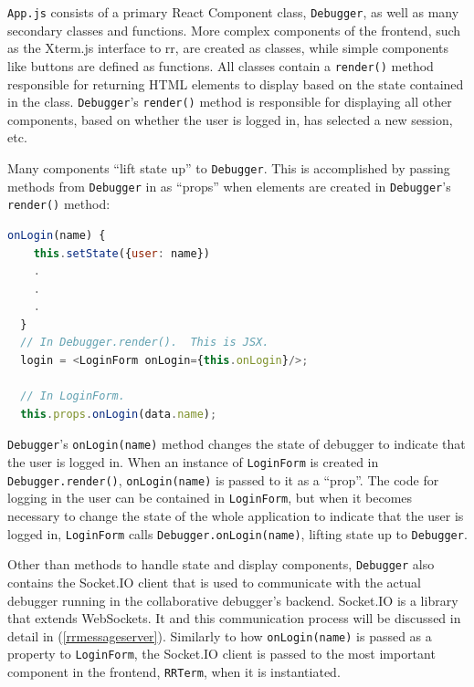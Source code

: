 \documentclass[12pt]{article}
\begin{document}
\lstinline{App.js} consists of a primary React Component class,
\lstinline{Debugger}, as well as many secondary classes and functions.
More complex components of the frontend, such as the Xterm.js
interface to rr, are created as classes, while simple components like
buttons are defined as functions.  All classes contain a
\lstinline{render()} method responsible for returning HTML elements to
display based on the state contained in the class.
\lstinline{Debugger}'s \lstinline{render()} method is responsible for
displaying all other components, based on whether the user is logged
in, has selected a new session, etc.
\par

Many components ``lift state up'' to \lstinline{Debugger}.  This is
accomplished by passing methods from \lstinline{Debugger} in as
``props'' when elements are created in \lstinline{Debugger}'s
\lstinline{render()} method:

\begin{lstlisting}[language=Javascript,basicstyle=\linespread{0.5}\ttfamily,caption={Lifting State Up},captionpos=b]
  onLogin(name) {
    this.setState({user: name})
    .
    .
    .
  }
  // In Debugger.render().  This is JSX.
  login = <LoginForm onLogin={this.onLogin}/>;
  
  // In LoginForm.
  this.props.onLogin(data.name);
\end{lstlisting}

\lstinline{Debugger}'s \lstinline{onLogin(name)} method changes the
state of debugger to indicate that the user is logged in.  When an
instance of \lstinline{LoginForm} is created in
\lstinline{Debugger.render()}, \lstinline{onLogin(name)} is passed to
it as a ``prop''.  The code for logging in the user can be contained
in \lstinline{LoginForm}, but when it becomes necessary to change the
state of the whole application to indicate that the user is logged in,
\lstinline{LoginForm} calls \lstinline{Debugger.onLogin(name)},
lifting state up to \lstinline{Debugger}.
\par

Other than methods to handle state and display components,
\lstinline{Debugger} also contains the Socket.IO client that is used
to communicate with the actual debugger running in the collaborative
debugger's backend.  Socket.IO is a library that extends WebSockets.
It and this communication process will be discussed in detail in
(\ref{rrmessageserver}).  Similarly to how \lstinline{onLogin(name)}
is passed as a property to \lstinline{LoginForm}, the Socket.IO client
is passed to the most important component in the frontend,
\lstinline{RRTerm}, when it is instantiated.
\end{document}
